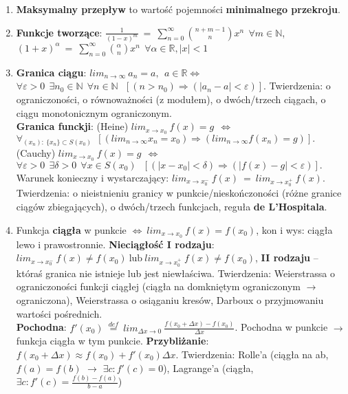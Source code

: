 \documentclass[12pt]{article}
\begin{document}
\begin{enumerate}
        \item \textbf{Maksymalny przepływ} to wartość pojemności \textbf{minimalnego przekroju}.

        \item \textbf{Funkcje tworzące}:
        $\frac{1}{(1-x)^m} ~ = ~ \sum_{n=0}^{\infty} \binom{n+m-1}{n} x^n ~~ \forall m \in \mathbb{N}$,\\
        $(1+x)^{\alpha} ~ = ~ \sum_{n=0}^{\infty} \binom{\alpha}{n} x^n ~~ \forall \alpha \in \mathbb{R}, |x| < 1$

        \item \textbf{Granica ciągu}: $lim_{n  \rightarrow \infty} ~ a_n = a, ~~ a \in \mathbb{R} \Leftrightarrow$\\
        $  \forall \varepsilon > 0 ~~ \exists  n_0 \in \mathbb{N} ~~ \forall n \in \mathbb{N} ~~~ [(n > n_0) \Rightarrow (|a_n - a| < \varepsilon)]$.
        Twierdzenia: o ograniczoności, o równoważności (z modułem), o dwóch/trzech ciągach, o ciągu monotonicznym
        ograniczonym.\\
        \textbf{Granica funckji}:
        (Heine) $lim_{x \rightarrow x_0} ~ f(x) = g ~~ \Leftrightarrow$\\
        $\forall_{(x_n): ~ \{x_n\} \subset S(x_0)} ~~ [(lim_{n \rightarrow \infty} x_n = x_0) \Rightarrow (lim_{n \rightarrow \infty} f(x_n) = g)].$\\
        (Cauchy)    $lim_{x \rightarrow x_0} ~ f(x)  = g ~~ \Leftrightarrow$\\
        $\forall \varepsilon > 0 ~~ \exists \delta > 0 ~~ \forall  x \in S(x_0)  ~~~ [(|x - x_0| <  \delta) \Rightarrow (|f(x) - g| < \varepsilon)].$
        Warunek konieczny i wystarczający: $lim_{x \rightarrow x^{-}_0}  ~ f(x) ~ = ~ lim_{x \rightarrow x^{+}_0}  ~ f(x)$.
        Twierdzenia: o nieistnieniu granicy w punkcie/nieskończoności (różne granice ciągów zbiegających),
        o dwóch/trzech funkcjach, reguła \textbf{de L'Hospitala}.

        \item Funkcja \textbf{ciągła} w punkcie $\Leftrightarrow ~ lim_{x \rightarrow x_0} ~ f(x) = f(x_0)$,
        kon i wys: ciągła lewo i prawostronnie. \textbf{Nieciągłość I rodzaju}:
        $lim_{x \rightarrow x^{-}_0} ~ f(x) \neq  f(x_0) ~ \text{lub} ~ lim_{x \rightarrow x^{+}_0} ~ f(x) \neq f(x_0)$,
        \textbf{II rodzaju} -- któraś granica nie istnieje lub jest niewłaściwa.
        Twierdzenia: Weierstrassa o ograniczoności funkcji ciągłej (ciągła na domkniętym ograniczonym $\rightarrow$ ograniczona),
        Weierstrassa o osiąganiu kresów, Darboux o przyjmowaniu wartości pośrednich.\\
        \textbf{Pochodna}: $f'(x_0) ~ \stackrel{def}{=} ~ lim_{\Delta x \rightarrow 0} ~ \frac{f(x_0 + \Delta x) - f(x_0)}{\Delta x}$.
        Pochodna w punkcie $\rightarrow$ funkcja ciągła w tym punkcie. \textbf{Przybliżanie}: $f(x_0 + \Delta x) \approx f(x_0) + f'(x_0)\Delta x$.
        Twierdzenia: Rolle'a (ciągła na ab, $f(a) = f(b)$ $\rightarrow$ $\exists c : f'(c) = 0$),
        Lagrange'a (ciągła, $\exists c : f'(c) = \frac{f(b)-f(a)}{b-a}$)


\end{enumerate}
\end{document}
